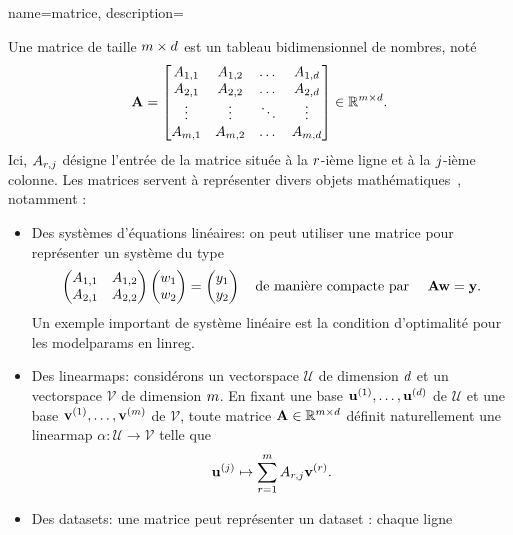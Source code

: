 {name={matrice},
	description={Une matrice de taille $m \times d$ est un tableau bidimensionnel de nombres, noté
		$$
		{\bf A} = \begin{bmatrix}
			A_{1,1} & A_{1,2} & \dots  & A_{1,d} \\
			A_{2,1} & A_{2,2} & \dots  & A_{2,d} \\
			\vdots  & \vdots  & \ddots & \vdots \\
			A_{m,1} & A_{m,2} & \dots  & A_{m,d}
		\end{bmatrix} \in \mathbb{R}^{m \times d}.
		$$
		Ici, $A_{r,j}$ désigne l’entrée de la matrice située à la $r$-ième ligne 
		et à la $j$-ième colonne. Les matrices servent à représenter divers objets mathématiques~\cite{StrangLinAlg2016}, notamment :
		\begin{itemize}
			\item Des systèmes d’équations linéaires: on peut utiliser une matrice pour représenter un système du type
			$$ \begin{pmatrix}
				A_{1,1} & A_{1,2} \\
				A_{2,1} & A_{2,2}
			\end{pmatrix}
			\begin{pmatrix}
				w_1 \\
				w_2
			\end{pmatrix}
			=\begin{pmatrix}
				y_1 \\
				y_2
			\end{pmatrix}
			\quad \text{de manière compacte par } \quad {\bf A} {\bf w} = {\bf y}.
			$$
			Un exemple important de système linéaire est la condition d’optimalité pour les \glspl{modelparam} en \gls{linreg}.
			\item Des \glspl{linearmap}: considérons un \gls{vectorspace} $\mathcal{U}$ de dimension $d$ 
			et un \gls{vectorspace} $\mathcal{V}$ de dimension $m$. En fixant une base $\mathbf{u}^{(1)},\ldots,\mathbf{u}^{(d)}$ de $\mathcal{U}$ 
			et une base $\mathbf{v}^{(1)},\ldots,\mathbf{v}^{(m)}$ de $\mathcal{V}$, toute matrice 
			${\bf A} \in \mathbb{R}^{m \times d}$ définit naturellement une \gls{linearmap} 
			$\alpha: \mathcal{U} \rightarrow \mathcal{V}$ telle que
			$${\bf u}^{(j)} \mapsto \sum_{r=1}^{m} A_{r,j} {\bf v}^{(r)}.$$
			\item Des \glspl{dataset}: une matrice peut représenter un \gls{dataset} : chaque ligne 

\end{itemize}}}
